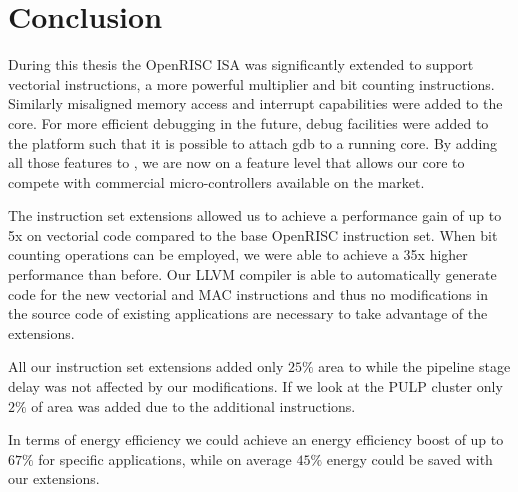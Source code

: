 
\chapter{Conclusion}

\label{chapter:conclusion}

During this thesis the OpenRISC \gls{ISA} was significantly extended to support
vectorial instructions, a more powerful multiplier and bit counting
instructions. Similarly misaligned memory access
and interrupt capabilities were added to the \orion core. For more efficient
debugging in the future, debug facilities were added to the platform such that
it is possible to attach gdb to a running \orion core. By adding all those
features to \orion, we are now on a feature level that allows our core to
compete with commercial micro-controllers available on the market.

The instruction set extensions allowed us to achieve a performance gain of up to
5x on vectorial code compared to the base OpenRISC instruction set. When bit
counting operations can be employed, we were able to achieve a 35x higher
performance than before.
Our LLVM compiler is able to automatically generate code for the new vectorial
and MAC instructions and thus no modifications in the source code of existing
applications are necessary to take advantage of the extensions.

All our instruction set extensions added only $25\%$ area to \orion while the
pipeline stage delay was not affected by our modifications. If we look at the
\gls{PULP} cluster only $2\%$ of area was added due to the additional
instructions.

In terms of energy efficiency we could achieve an energy efficiency boost of up
to $67\%$ for specific applications, while on average $45\%$ energy could be
saved with our extensions.

